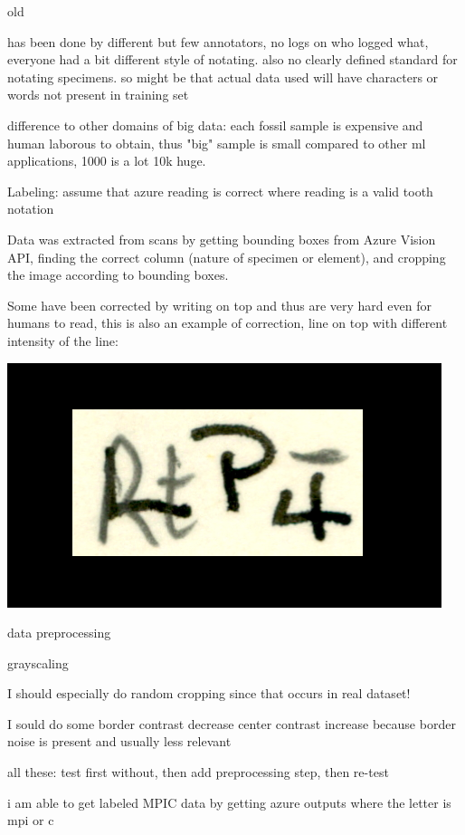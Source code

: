 \documentclass{article}
\begin{document}
old

has been done by different but few annotators, no logs on who logged what, everyone 
had a bit different style of notating. also no clearly defined standard 
for notating specimens. so might be that actual data used will have 
characters or words not present in training set

difference to other domains of big data:
each fossil sample is expensive and human laborous to obtain, thus "big" sample is 
small compared to other ml applications, 1000 is a lot 10k huge.

Labeling: assume that azure reading is correct where reading is a valid tooth notation

Data was extracted from scans by getting bounding boxes from Azure Vision API,
finding the correct column (nature of specimen or element), and cropping the image 
according to bounding boxes.

Some have been corrected by writing on top and thus are very hard 
even for humans to read, this is also an example of correction, line on top with different
intensity of the line: 

\includegraphics*[scale=0.2]{../images/superambiguous_data_sample.png}

data preprocessing

grayscaling

I should especially do random cropping since that occurs in real dataset!

I sould do some border contrast decrease center contrast increase because border noise is present and usually less relevant 

all these: test first without, then add preprocessing step, then re-test

i am able to get labeled MPIC data by getting azure outputs where the letter is mpi or c
\end{document}
